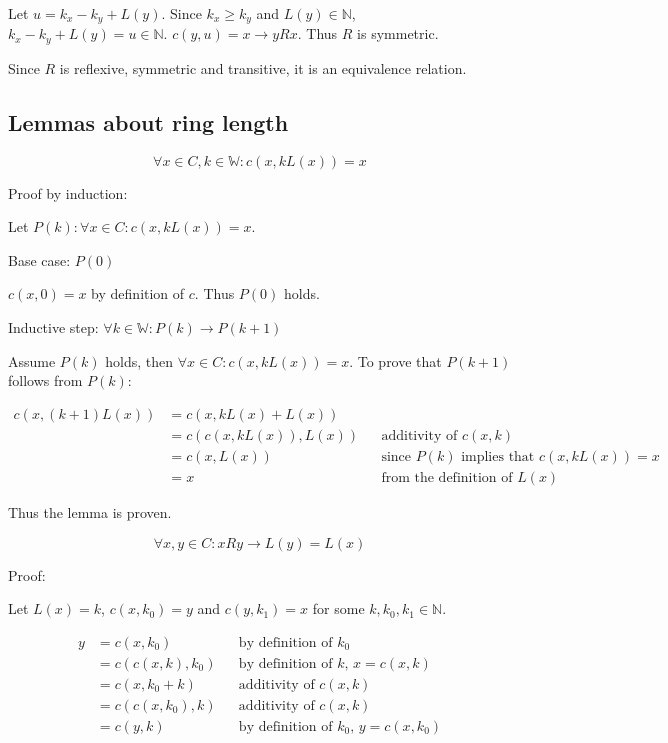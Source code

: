 \documentclass[11pt]{article}
\begin{document}
    Let $u=k_{x}-k_{y}+L(y)$. Since $k_{x}\geq k_{y}$ and $L(y) \in \mathbb{N}$, $k_{x}-k_{y}+L(y)=u \in \mathbb{N}$. $c(y,u)=x \rightarrow yRx$. Thus $R$ is symmetric.

    Since $R$ is reflexive, symmetric and transitive, it is an equivalence relation.

    \subsection{Lemmas about ring length}

    \begin{equation}
        \forall x \in C, k \in \mathbb{W}: c(x,kL(x)) = x
        \label{whole_walks_around_cycle}
    \end{equation}

    Proof by induction:

    Let $P(k): \forall x \in C: c(x,kL(x)) = x$.

    Base case: $P(0)$

    $c(x,0) = x$ by definition of $c$. Thus $P(0)$ holds.

    Inductive step: $\forall k \in \mathbb{W}: P(k) \rightarrow P(k+1)$

    Assume $P(k)$ holds, then $\forall x \in C: c(x,kL(x))=x$. To prove that $P(k+1)$ follows from $P(k)$:

    \begin{align*}
        \text{$c(x,(k+1)L(x))$} &= \text{$c(x,kL(x)+L(x))$} && \text{} \\
        &= \text{$c(c(x,kL(x)),L(x))$} && \text{additivity of $c(x,k)$} \\
        &= \text{$c(x,L(x))$} && \text{since $P(k)$ implies that $c(x,kL(x))=x$} \\
        &= \text{$x$} && \text{from the definition of $L(x)$}
    \end{align*}

    Thus the lemma is proven.

    \begin{equation}
        \forall x,y \in C: xRy \rightarrow L(y) = L(x)
        \label{cycle_length_is_same}
    \end{equation}

    Proof:

    Let $L(x)=k$, $c(x,k_{0})=y$ and $c(y,k_{1})=x$ for some $k,k_{0},k_{1} \in \mathbb{N}$.

    \begin{align*}
        \text{$y$} &= \text{$c(x,k_{0})$} && \text{by definition of $k_{0}$} \\
        &= \text{$c(c(x,k),k_{0})$} && \text{by definition of $k$, $x=c(x,k)$} \\
        &= \text{$c(x,k_{0}+k)$} && \text{additivity of $c(x,k)$} \\
        &= \text{$c(c(x,k_{0}),k)$} && \text{additivity of $c(x,k)$} \\
        &= \text{$c(y,k)$} && \text{by definition of $k_{0}$, $y=c(x,k_{0})$}
    \end{align*}
\end{document}
